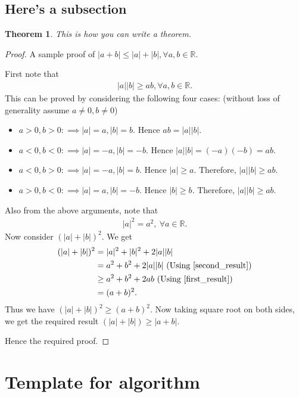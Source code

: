 \documentclass[twosided]{article}
\newcounter{lecnum}
\newtheorem{theorem}{Theorem}[lecnum]
\begin{document}
\subsection{Here's a subsection}

\begin{theorem} This is how you can write a theorem. 
\end{theorem}
\begin{proof}
	A sample proof of $|a+b| \leq |a| + |b|, \forall a,b \in \mathbb{R}$.
	
	First note that 
	\begin{align}
	|a||b|\geq ab, \forall a,b \in \mathbb{R}. \label{first_result}
	\end{align}
	This can be proved by considering the following four cases: (without loss of generality assume $a\neq 0, b\neq 0$)
	\begin{itemize}
		\item $a>0,b>0: \implies |a|=a, |b|=b$. Hence $ab = |a||b|$. 
		\item $a<0,b<0: \implies |a|=-a, |b|=-b$. Hence $|a||b| = (-a)(-b)=ab$.  
		\item $a<0,b>0: \implies |a|=-a, |b|=b$. Hence $|a|\geq a$. Therefore, $|a||b| \geq ab$.
		\item $a>0,b<0: \implies |a|=a, |b|=-b$. Hence $|b|\geq b$. Therefore, $|a||b| \geq ab$.
	\end{itemize} 
	Also from the above arguments, note that
	\begin{align}
	|a|^2 = a^2, \ \forall  a \in \mathbb{R}. \label{second_result}
	\end{align} 
	Now consider $(|a|+|b|)^2$. We get
	\begin{align}
	(|a|+|b|)^2 & = |a|^2 + |b|^2 + 2|a||b| \nonumber \\
	& = a^2 + b^2  + 2|a||b| \text{  (Using \eqref{second_result})} \nonumber \\
	& \geq a^2 + b^2  + 2ab \text{  (Using \eqref{first_result})} \nonumber \\
	& = (a+b)^2. \label{last_step}		
	\end{align}
	Thus we have $(|a|+|b|)^2 \geq (a+b)^2$. 
	Now taking square root on both sides, we get the required result $(|a|+|b|) \geq |a+b|$.  
	
	Hence the required proof.
\end{proof}


\section{Template for algorithm}
\end{document}
